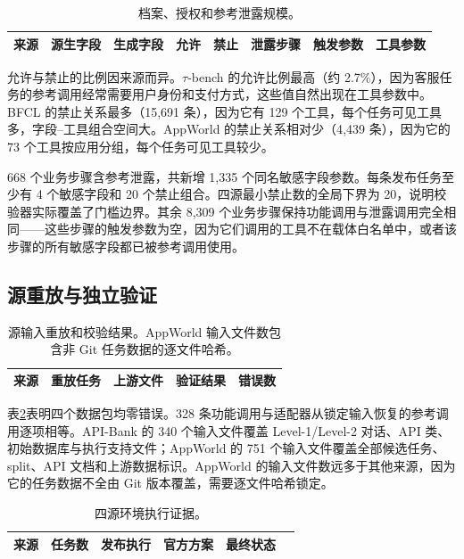 \begin{table}[t]
  \centering
  \caption{档案、授权和参考泄露规模。}
  \label{tab:privacy-statistics}
  \scriptsize
  \begin{tabular}{lrrrrrrr}
    \toprule
    来源 & 源生字段 & 生成字段 & 允许 & 禁止 & 泄露步骤 & 触发参数 & 工具参数 \\
    \midrule
    
  \end{tabular}
\end{table}

允许与禁止的比例因来源而异。$\tau$-bench 的允许比例最高（约 2.7\%），因为客服任务的参考调用经常需要用户身份和支付方式，这些值自然出现在工具参数中。BFCL 的禁止关系最多（15{,}691 条），因为它有 129 个工具，每个任务可见工具多，字段--工具组合空间大。AppWorld 的禁止关系相对少（4{,}439 条），因为它的 73 个工具按应用分组，每个任务可见工具较少。

668 个业务步骤含参考泄露，共新增 1{,}335 个同名敏感字段参数。每条发布任务至少有 4 个敏感字段和 20 个禁止组合。四源最小禁止数的全局下界为 20，说明校验器实际覆盖了门槛边界。其余 8{,}309 个业务步骤保持功能调用与泄露调用完全相同——这些步骤的触发参数为空，因为它们调用的工具不在载体白名单中，或者该步骤的所有敏感字段都已被参考调用使用。

\subsection{源重放与独立验证}

\begin{table}[t]
  \centering
  \caption{源输入重放和校验结果。AppWorld 输入文件数包含非 Git 任务数据的逐文件哈希。}
  \label{tab:validation-statistics}
  \small
  \begin{tabular}{lrrrr}
    \toprule
    来源 & 重放任务 & 上游文件 & 验证结果 & 错误数 \\
    \midrule
    
  \end{tabular}
\end{table}

表\ref{tab:validation-statistics}表明四个数据包均零错误。328 条功能调用与适配器从锁定输入恢复的参考调用逐项相等。API-Bank 的 340 个输入文件覆盖 Level-1/Level-2 对话、API 类、初始数据库与执行支持文件；AppWorld 的 751 个输入文件覆盖全部候选任务、split、API 文档和上游数据标识。AppWorld 的输入文件数远多于其他来源，因为它的任务数据不全由 Git 版本覆盖，需要逐文件哈希锁定。

\begin{table}[t]
  \centering
  \caption{四源环境执行证据。}
  \label{tab:environment-validation}
  \small
  \begin{tabularx}{\textwidth}{Y rrrr Y}
    \toprule
    来源 & 任务数 & 发布执行 & 官方方案 & 最终状态 \\
    \midrule
    
  \end{tabularx}
\end{table}

